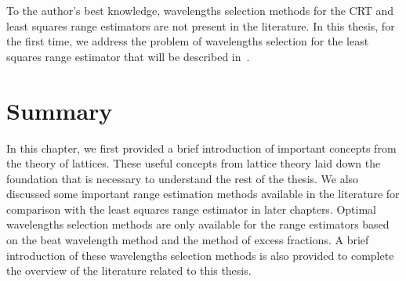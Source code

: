 To the author's best knowledge, wavelengths selection methods for the CRT and least squares range estimators are not present in the literature. In this thesis, for the first time, we address the problem of wavelengths selection for the least squares range estimator that will be described in~.

\section{Summary}
In this chapter, we first provided a brief introduction of important concepts from the theory of lattices. These useful concepts from lattice theory laid down the foundation that is necessary to understand the rest of the thesis. We also discussed some important range estimation methods available in the literature for comparison with the least squares range estimator in later chapters. Optimal wavelengths selection methods are only available for the range estimators based on the beat wavelength method and the method of excess fractions. A brief introduction of these wavelengths selection methods is also provided to complete the overview of the literature related to this thesis.

















